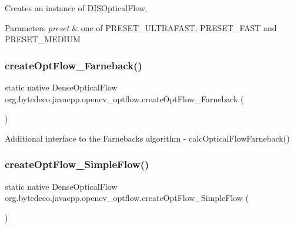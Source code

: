 Creates an instance of D\+I\+S\+Optical\+Flow. 


\begin{DoxyParams}{Parameters}
{\em preset} & one of P\+R\+E\+S\+E\+T\+\_\+\+U\+L\+T\+R\+A\+F\+A\+ST, P\+R\+E\+S\+E\+T\+\_\+\+F\+A\+ST and P\+R\+E\+S\+E\+T\+\_\+\+M\+E\+D\+I\+UM \\
\hline
\end{DoxyParams}
\mbox{\label{group__optflow_gabd230cc626a64515ec35ac6c6c7fc099}} 
\subsubsection{\texorpdfstring{create\+Opt\+Flow\+\_\+\+Farneback()}{createOptFlow\_Farneback()}}
{\footnotesize\ttfamily static native Dense\+Optical\+Flow org.\+bytedeco.\+javacpp.\+opencv\+\_\+optflow.\+create\+Opt\+Flow\+\_\+\+Farneback (\begin{DoxyParamCaption}{ }\end{DoxyParamCaption})\hspace{0.3cm}{\ttfamily [static]}}

Additional interface to the Farneback\textquotesingle{}s algorithm -\/ calc\+Optical\+Flow\+Farneback() \mbox{\label{group__optflow_gace52b781a9780c4c9a20951a2bec314d}} 
\subsubsection{\texorpdfstring{create\+Opt\+Flow\+\_\+\+Simple\+Flow()}{createOptFlow\_SimpleFlow()}}
{\footnotesize\ttfamily static native Dense\+Optical\+Flow org.\+bytedeco.\+javacpp.\+opencv\+\_\+optflow.\+create\+Opt\+Flow\+\_\+\+Simple\+Flow (\begin{DoxyParamCaption}{ }\end{DoxyParamCaption})\hspace{0.3cm}{\ttfamily [static]}}

